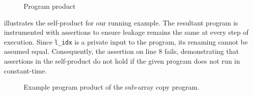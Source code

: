 \begin{figure}[h]
    \centering
    \label{fig:fig_7}
    \label{fig:fig_8}
    \caption{Program product}
    \label{fig:rules}
\end{figure}

 illustrates the self-product for our running example. 
The resultant program is instrumented with assertions to ensure leakage remains the same at
every step of execution.
Since \texttt{l\_idx} is a private input to the program, its renaming cannot be assumed equal.
Consequently, the assertion on line $8$ fails, demonstrating that assertions in the self-product do not hold if the given program does not run in constant-time.

\begin{figure}[h]
    \centering\resizebox{1.2\columnwidth}{!}{}
    \caption{Example program product of the sub-array copy program.}
    \label{fig:example_prod}
\end{figure}

